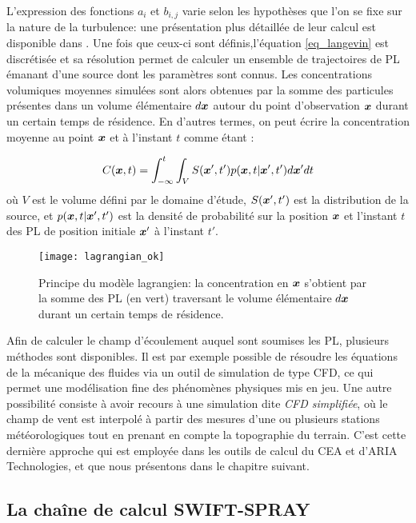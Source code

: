 L'expression des fonctions $a_i$ et $b_{i,j}$ varie selon les hypothèses que l'on se fixe sur la nature de la turbulence: une présentation plus détaillée de leur calcul est disponible dans \cite{Wilson1996}. Une fois que ceux-ci sont définis,l'équation \eqref{eq_langevin} est discrétisée et sa résolution permet de calculer un ensemble de trajectoires de PL émanant d'une source dont les paramètres sont connus. Les concentrations volumiques moyennes simulées sont alors obtenues par la somme des particules présentes dans un volume élémentaire $d{\bm{x}}$ autour du point d'observation ${\bm{x}}$ durant un certain temps de résidence. En d'autres termes, on peut écrire la concentration moyenne au point ${\bm{x}}$ et à l'instant $t$ comme étant : 

\begin{equation}
	C({\bm{x}}, t) = \int _{-\infty}^{t} \int_{V} S({\bm{x}}',t')p({\bm{x}}, t | {\bm{x}}', t')d{\bm{x}}'dt
	\label{eq_c_moyen_lagrangien}
\end{equation}
où $V$ est le volume défini par le domaine d'étude, $S({\bm{x}}',t')$ est la distribution de la source, et $p({\bm{x}}, t | {\bm{x}}', t')$ est la densité de probabilité sur la position ${\bm{x}}$ et l'instant $t$ des PL de position initiale ${\bm{x}}'$ à l'instant $t'$. \\

\begin{figure}
	\centering
	\texttt{[image: lagrangian\_ok]}
	\caption{Principe du modèle lagrangien: la concentration en ${\bm{x}}$ s'obtient par la somme des PL (en vert) traversant le volume élémentaire $d{\bm{x}}$ durant un certain temps de résidence.}
	\label{fig_schema_lagrangien}
\end{figure}

Afin de calculer le champ d'écoulement auquel sont soumises les PL, plusieurs méthodes sont disponibles. Il est par exemple possible de résoudre les équations de la mécanique des fluides via un outil de simulation de type CFD, ce qui permet une modélisation fine des phénomènes physiques mis en jeu. Une autre possibilité consiste à avoir recours à une simulation dite \textit{CFD simplifiée}, où le champ de vent est interpolé à partir des mesures d'une ou plusieurs stations météorologiques tout en prenant en compte la topographie du terrain. C'est cette dernière approche qui est employée dans les outils de calcul du CEA et d'ARIA Technologies, et que nous présentons dans le chapitre suivant. \\

\subsection{La chaîne de calcul SWIFT-SPRAY}

